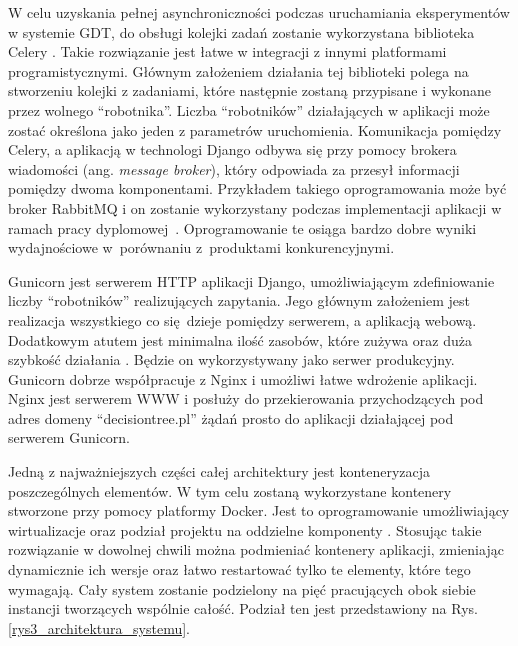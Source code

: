 W celu uzyskania pełnej asynchroniczności podczas uruchamiania eksperymentów w systemie GDT, do obsługi kolejki zadań zostanie wykorzystana biblioteka Celery \cite{misc_celery}. Takie rozwiązanie jest łatwe w integracji z innymi platformami programistycznymi. Głównym założeniem działania tej biblioteki polega na stworzeniu kolejki z zadaniami, które następnie zostaną przypisane i wykonane przez wolnego \enquote{robotnika}. Liczba \enquote{robotników} działających w aplikacji może zostać określona jako jeden z parametrów uruchomienia. Komunikacja pomiędzy Celery, a aplikacją w technologi Django odbywa się przy pomocy brokera wiadomości (ang. \textit{message broker}), który odpowiada za przesył informacji pomiędzy dwoma komponentami. Przykładem takiego oprogramowania może być broker RabbitMQ i on zostanie wykorzystany podczas implementacji aplikacji w ramach pracy dyplomowej~\cite{misc_rabbit}. Oprogramowanie te osiąga bardzo dobre wyniki wydajnościowe w~porównaniu z~produktami konkurencyjnymi.

Gunicorn jest serwerem HTTP aplikacji Django, umożliwiającym zdefiniowanie liczby \enquote{robotników}  realizujących zapytania. Jego głównym założeniem jest realizacja wszystkiego co się dzieje pomiędzy serwerem, a aplikacją webową. Dodatkowym atutem jest minimalna ilość zasobów, które zużywa oraz duża szybkość działania \cite{misc_gunicorn}. Będzie on wykorzystywany jako serwer produkcyjny. Gunicorn dobrze współpracuje z Nginx i umożliwi łatwe wdrożenie aplikacji. Nginx jest serwerem WWW i posłuży do przekierowania przychodzących pod adres domeny \enquote{decisiontree.pl} żądań prosto do aplikacji działającej pod serwerem Gunicorn.

Jedną z najważniejszych części całej architektury jest konteneryzacja poszczególnych elementów. W tym celu zostaną wykorzystane kontenery stworzone przy pomocy platformy Docker. Jest to oprogramowanie umożliwiający wirtualizacje oraz podział projektu na oddzielne komponenty \cite{misc_docker}. Stosując takie rozwiązanie w dowolnej chwili można podmieniać kontenery aplikacji, zmieniając dynamicznie ich wersje oraz łatwo restartować tylko te elementy, które tego wymagają. Cały system zostanie podzielony na pięć pracujących obok siebie instancji tworzących wspólnie całość. Podział ten jest przedstawiony na Rys. \ref{rys3_architektura_systemu}.


 
 





